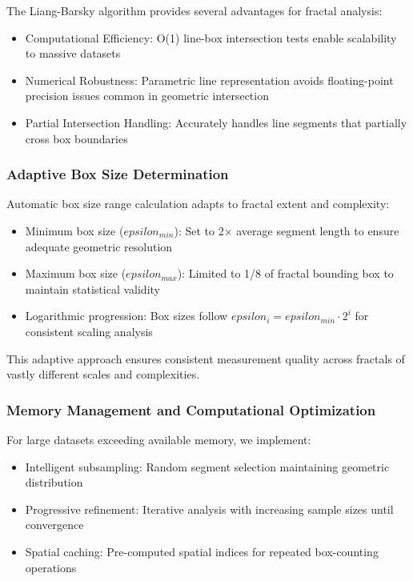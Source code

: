 \documentclass[preprint,12pt]{elsarticle}
\def\textbf#1{#1}%
\def\epsilon{epsilon}%
\begin{document}
The Liang-Barsky algorithm provides several advantages for fractal analysis:
\begin{itemize}
\item \textbf{Computational Efficiency}: O(1) line-box intersection tests enable scalability to massive datasets
\item \textbf{Numerical Robustness}: Parametric line representation avoids floating-point precision issues common in geometric intersection
\item \textbf{Partial Intersection Handling}: Accurately handles line segments that partially cross box boundaries
\end{itemize}

\subsubsection{Adaptive Box Size Determination}

Automatic box size range calculation adapts to fractal extent and complexity:

\begin{itemize}
\item \textbf{Minimum box size ($\epsilon_{min}$)}: Set to 2× average segment length to ensure adequate geometric resolution
\item \textbf{Maximum box size ($\epsilon_{max}$)}: Limited to 1/8 of fractal bounding box to maintain statistical validity
\item \textbf{Logarithmic progression}: Box sizes follow $\epsilon_i = \epsilon_{min} \cdot 2^i$ for consistent scaling analysis
\end{itemize}

This adaptive approach ensures consistent measurement quality across fractals of vastly different scales and complexities.

\subsubsection{Memory Management and Computational Optimization}

For large datasets exceeding available memory, we implement:
\begin{itemize}
\item \textbf{Intelligent subsampling}: Random segment selection maintaining geometric distribution
\item \textbf{Progressive refinement}: Iterative analysis with increasing sample sizes until convergence
\item \textbf{Spatial caching}: Pre-computed spatial indices for repeated box-counting operations
\end{itemize}
\end{document}
